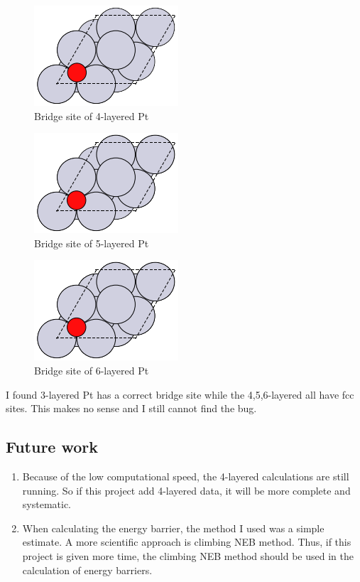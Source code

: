 \documentclass[11pt]{article}
\begin{document}
\begin{figure}[H]
\centering
\includegraphics[width=203bp,]{./images/geometry/Pt-O-bridge-4.png}
\caption{Bridge site of 4-layered Pt}
\end{figure}

\begin{figure}[H]
\centering
\includegraphics[width=203bp,]{./images/geometry/Pt-O-bridge-5.png}
\caption{Bridge site of 5-layered Pt}
\end{figure}

\begin{figure}[H]
\centering
\includegraphics[width=203bp,]{./images/geometry/Pt-O-bridge-6.png}
\caption{Bridge site of 6-layered Pt}
\end{figure}

I found 3-layered Pt has a correct bridge site while the 4,5,6-layered all have fcc sites. This makes no sense and I still cannot find the bug.
\subsection{Future work}
\label{sec-5-2}

\begin{enumerate}
\item Because of the low computational speed, the 4-layered calculations are still running. So if this project add 4-layered data, it will be more complete and systematic.
\item When calculating the energy barrier, the method I used was a simple estimate. A more scientific approach is climbing NEB method. Thus, if this project is given more time, the climbing NEB method should be used in the calculation of energy barriers.
\end{enumerate}
\end{document}
